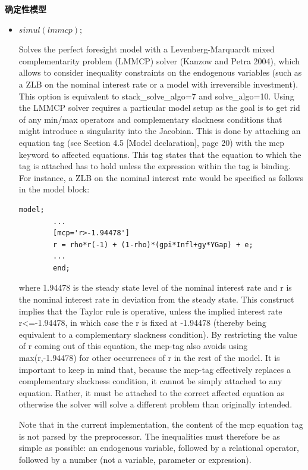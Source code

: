 \documentclass[cn,10pt,math=newtx,citestyle=gb7714-2015,bibstyle=gb7714-2015]{elegantbook}
\begin{document}
\textbf{确定性模型}
\begin{itemize}
	\item $simul(lmmcp);$
	
	Solves the perfect foresight model with a Levenberg-Marquardt mixed complementarity problem (LMMCP) solver (Kanzow and Petra 2004), which allows to consider inequality constraints on the endogenous variables (such as a ZLB on the nominal interest rate or a model with irreversible investment). This option is equivalent to stack\_solve\_algo=7 and solve\_algo=10. Using the LMMCP solver requires a particular model setup as the goal is to get rid of any min/max operators and complementary slackness conditions that might introduce a singularity into the Jacobian. This is done by attaching an equation tag (see Section 4.5 [Model declaration], page 20) with the mcp keyword to affected equations. This tag states that the equation to which the tag is attached has to hold unless the expression within the tag is binding. For instance, a ZLB on the nominal interest rate would be specified as follows in the model block:
	
	\begin{lstlisting}[frame=shadowbox]
		model;
		...
		[mcp='r>-1.94478']
		r = rho*r(-1) + (1-rho)*(gpi*Infl+gy*YGap) + e;
		...
		end;
	\end{lstlisting}
	
	where 1.94478 is the steady state level of the nominal interest rate and r is the nominal interest rate in deviation from the steady state. This construct implies that the Taylor rule is operative, unless the implied interest rate r<=-1.94478, in which case the r is fixed at -1.94478 (thereby being equivalent to a complementary slackness condition). By restricting the value of r coming out of this equation, the mcp-tag also avoids using max(r,-1.94478) for other occurrences of r in the rest of the model. It is important to keep in mind that, because the mcp-tag effectively replaces a complementary slackness condition, it cannot be simply attached to any equation. Rather, it must be attached to the correct affected equation as otherwise the solver will solve a different problem than originally intended.
	
	Note that in the current implementation, the content of the mcp equation tag is not parsed by the preprocessor. The inequalities must therefore be as simple as possible: an endogenous variable, followed by a relational operator, followed by a number (not a variable, parameter or expression).
	
\end{itemize}
\end{document}
